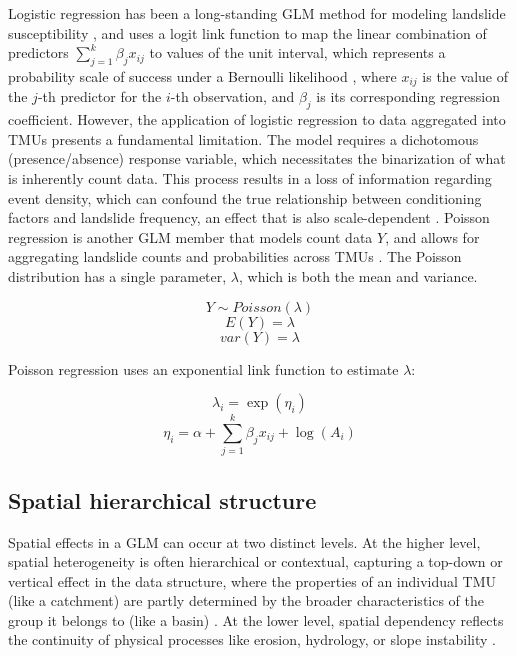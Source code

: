 \documentclass[journal abbreviation, manuscript]{copernicus}
\begin{document}
Logistic regression has been a long-standing GLM method for modeling landslide susceptibility \citep{david2000applied, ayalew2005application}, and uses a logit link function to map the linear combination of predictors $\sum_{j=1}^k \beta_j x_{ij}$ to values of the unit interval, which represents a probability scale of success under a Bernoulli likelihood \citep{david2000applied}, where $x_{ij}$ is the value of the $j$-th predictor for the $i$-th observation, and $\beta_{j}$ is its corresponding regression coefficient. However, the application of logistic regression to data aggregated into TMUs presents a fundamental limitation. The model requires a dichotomous (presence/absence) response variable, which necessitates the binarization of what is inherently count data. This process results in a loss of information regarding event density, which can confound the true relationship between conditioning factors and landslide frequency, an effect that is also scale-dependent \citep{lombardo2018point}. Poisson regression is another GLM member that models count data $Y$, and allows for aggregating landslide counts and probabilities across TMUs \citep{tay2014landslide, opitz2022high}. The Poisson distribution has a single parameter, $\lambda$, which is both the mean and variance.

\begin{equation}
Y \sim Poisson(\lambda)
\end{equation}
\begin{equation}
E(Y) = \lambda
\end{equation}
\begin{equation}
var(Y) = \lambda
\end{equation}

Poisson regression uses an exponential link function to estimate $\lambda$:

\begin{equation}
\lambda_i = \exp(\eta_i)
\end{equation}
\begin{equation}
\eta_i = \alpha + \sum_{j=1}^k \beta_j x_{ij} + \log(A_i)
\end{equation}

\subsection{Spatial hierarchical structure}\label{subsec21}

Spatial effects in a GLM can occur at two distinct levels. At the higher level, spatial heterogeneity is often hierarchical or contextual, capturing a top-down or vertical effect in the data structure, where the properties of an individual TMU (like a catchment) are partly determined by the broader characteristics of the group it belongs to (like a basin) \citep{corrado2011multilevel}. At the lower level, spatial dependency reflects the continuity of physical processes like erosion, hydrology, or slope instability \citep{cellmer2019application}.
\end{document}

